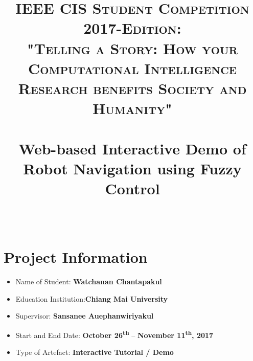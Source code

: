 \documentclass[paper=a4, fontsize=11pt]{scrartcl}
\title{
	\usefont{OT1}{bch}{b}{n}
	\normalfont \normalsize \textsc{IEEE CIS Student Competition 2017-Edition: \\ "Telling a Story: How your Computational Intelligence Research benefits Society and Humanity"} \\ [25pt]
	\horrule{0.5pt} \\[0.4cm]
	\huge Web-based Interactive Demo of Robot Navigation using Fuzzy Control \\
	\horrule{2pt} \\[0cm]
}
\date{}
\numberwithin{equation}{section}		%
\numberwithin{figure}{section}			%
\numberwithin{table}{section}				%
\begin{document}
	\maketitle
	
	\section{Project Information}
	
	\begin{itemize}
		\item Name of Student: \textbf{Watchanan Chantapakul}
		\item Education Institution:\textbf{Chiang Mai University}
		\item Supervisor: \textbf{Sansanee Auephanwiriyakul}
		\item Start and End Date: \textbf{October 26\textsuperscript{th}} -- \textbf{November 11\textsuperscript{th}, 2017}
		\item Type of Artefact: \textbf{Interactive Tutorial / Demo}
	\end{itemize}
	
	
	
\end{document}
